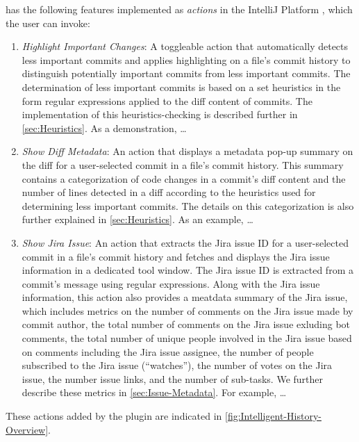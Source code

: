  has the following features implemented as \emph{actions} in the IntelliJ Platform , which the user can invoke:

\begin{enumerate}[label=(\Alph*)]
    \item \textit{Highlight Important Changes}: A toggleable action that automatically detects less important commits and applies highlighting on a file's commit history to distinguish potentially important commits from less important commits. The determination of less important commits is based on a set heuristics in the form regular expressions applied to the diff content of commits. The implementation of this heuristics-checking is described further in \autoref{sec:Heuristics}. As a demonstration, \dots {}
    \item \textit{Show Diff Metadata}: An action that displays a metadata pop-up summary on the diff for a user-selected commit in a file's commit history. This summary contains a categorization of code changes in a commit's diff content and the number of lines detected in a diff according to the heuristics used for determining less important commits. The details on this categorization is also further explained in \autoref{sec:Heuristics}. As an example, \dots {}
    \item \textit{Show Jira Issue}: An action that extracts the Jira issue ID for a user-selected commit in a file's commit history and fetches and displays the Jira issue information in a dedicated tool window. The Jira issue ID is extracted from a commit's message using regular expressions. Along with the Jira issue information, this action also provides a meatdata summary of the Jira issue, which includes metrics on the number of comments on the Jira issue made by commit author, the total number of comments on the Jira issue exluding bot comments, the total number of unique people involved in the Jira issue based on comments including the Jira issue assignee, the number of people subscribed to the Jira issue (``watches''), the number of votes on the Jira issue, the number issue links, and the number of sub-tasks. We further describe these metrics in \autoref{sec:Issue-Metadata}. For example, \dots {}
\end{enumerate}

These actions added by the  plugin are indicated in \autoref{fig:Intelligent-History-Overview}.

